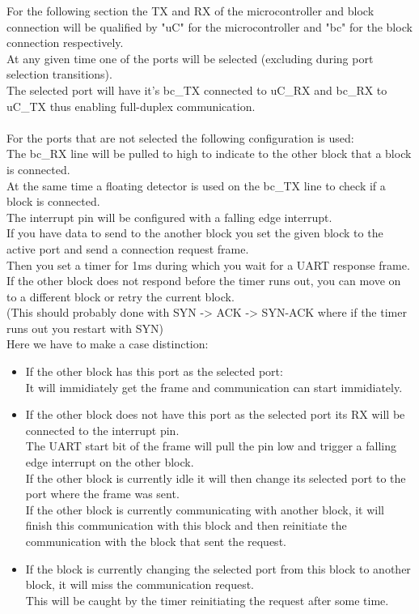 For the following section the TX and RX of the microcontroller and block connection will be qualified by "uC" for the microcontroller and "bc" for the block connection respectively.\\
At any given time one of the ports will be selected (excluding during port selection transitions).\\
The selected port will have it's bc\_TX connected to uC\_RX and bc\_RX to uC\_TX thus enabling full-duplex communication.\\ \\
For the ports that are not selected the following configuration is used:\\
The bc\_RX line will be pulled to high to indicate to the other block that a block is connected.\\
At the same time a floating detector is used on the bc\_TX line to check if a block is connected.\\
The interrupt pin will be configured with a falling edge interrupt.\\
If you have data to send to the another block you set the given block to the active port and send a connection request frame.\\
Then you set a timer for 1ms during which you wait for a UART response frame.\\
If the other block does not respond before the timer runs out, you can move on to a different block or retry the current block.\\
(This should probably done with SYN -> ACK -> SYN-ACK where if the timer runs out you restart with SYN)\\
Here we have to make a case distinction:
\begin{itemize}
  \item If the other block has this port as the selected port:\\
    It will immidiately get the frame and communication can start immidiately.
  \item If the other block does not have this port as the selected port its RX will be connected to the interrupt pin.\\ 
    The UART start bit of the frame will pull the pin low and trigger a falling edge interrupt on the other block.\\
    If the other block is currently idle it will then change its selected port to the port where the frame was sent.\\
    If the other block is currently communicating with another block, it will finish this communication with this block and then reinitiate the communication with the block that sent the request.
  \item If the block is currently changing the selected port from this block to another block, it will miss the communication request.\\
    This will be caught by the timer reinitiating the request after some time.
\end{itemize}

